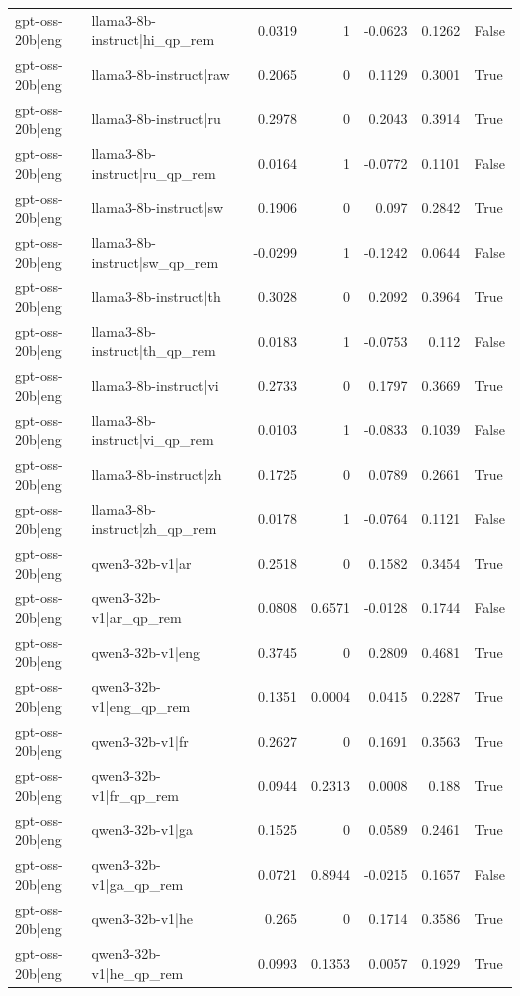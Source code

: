 \begin{table}
\begin{tabular}{l l r r r r l}
gpt-oss-20b|eng & llama3-8b-instruct|hi_qp_rem & 0.0319 & 1 & -0.0623 & 0.1262 & False \\
gpt-oss-20b|eng & llama3-8b-instruct|raw & 0.2065 & 0 & 0.1129 & 0.3001 & True \\
gpt-oss-20b|eng & llama3-8b-instruct|ru & 0.2978 & 0 & 0.2043 & 0.3914 & True \\
gpt-oss-20b|eng & llama3-8b-instruct|ru_qp_rem & 0.0164 & 1 & -0.0772 & 0.1101 & False \\
gpt-oss-20b|eng & llama3-8b-instruct|sw & 0.1906 & 0 & 0.097 & 0.2842 & True \\
gpt-oss-20b|eng & llama3-8b-instruct|sw_qp_rem & -0.0299 & 1 & -0.1242 & 0.0644 & False \\
gpt-oss-20b|eng & llama3-8b-instruct|th & 0.3028 & 0 & 0.2092 & 0.3964 & True \\
gpt-oss-20b|eng & llama3-8b-instruct|th_qp_rem & 0.0183 & 1 & -0.0753 & 0.112 & False \\
gpt-oss-20b|eng & llama3-8b-instruct|vi & 0.2733 & 0 & 0.1797 & 0.3669 & True \\
gpt-oss-20b|eng & llama3-8b-instruct|vi_qp_rem & 0.0103 & 1 & -0.0833 & 0.1039 & False \\
gpt-oss-20b|eng & llama3-8b-instruct|zh & 0.1725 & 0 & 0.0789 & 0.2661 & True \\
gpt-oss-20b|eng & llama3-8b-instruct|zh_qp_rem & 0.0178 & 1 & -0.0764 & 0.1121 & False \\
gpt-oss-20b|eng & qwen3-32b-v1|ar & 0.2518 & 0 & 0.1582 & 0.3454 & True \\
gpt-oss-20b|eng & qwen3-32b-v1|ar_qp_rem & 0.0808 & 0.6571 & -0.0128 & 0.1744 & False \\
gpt-oss-20b|eng & qwen3-32b-v1|eng & 0.3745 & 0 & 0.2809 & 0.4681 & True \\
gpt-oss-20b|eng & qwen3-32b-v1|eng_qp_rem & 0.1351 & 0.0004 & 0.0415 & 0.2287 & True \\
gpt-oss-20b|eng & qwen3-32b-v1|fr & 0.2627 & 0 & 0.1691 & 0.3563 & True \\
gpt-oss-20b|eng & qwen3-32b-v1|fr_qp_rem & 0.0944 & 0.2313 & 0.0008 & 0.188 & True \\
gpt-oss-20b|eng & qwen3-32b-v1|ga & 0.1525 & 0 & 0.0589 & 0.2461 & True \\
gpt-oss-20b|eng & qwen3-32b-v1|ga_qp_rem & 0.0721 & 0.8944 & -0.0215 & 0.1657 & False \\
gpt-oss-20b|eng & qwen3-32b-v1|he & 0.265 & 0 & 0.1714 & 0.3586 & True \\
gpt-oss-20b|eng & qwen3-32b-v1|he_qp_rem & 0.0993 & 0.1353 & 0.0057 & 0.1929 & True \\

\end{tabular}
\end{table}
